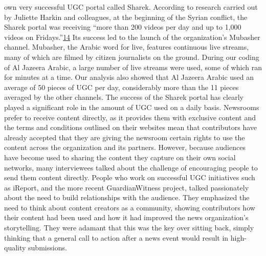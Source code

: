 \documentclass[symmetric, notoc, nobib]{towcenter-book}
\begin{document}
\begin{enumerate}
own very successful UGC portal called Sharek. According to research carried
out by Juliette Harkin and colleagues, at the beginning of the Syrian
conflict, the Sharek portal was receiving ``more than 200 videos per day and
up to 1,000 videos on Fridays.''{\href{#endnotes}{14}} Its success led to the launch of the organization's
Mubasher channel. Mubasher, the Arabic word for live, features
continuous live streams, many of which are filmed by citizen journalists on
the ground. During our coding of Al Jazeera Arabic, a large number of live
streams were used, some of which ran for minutes at a time. Our analysis
also showed that Al Jazeera Arabic used an average of 50 pieces of UGC per
day, considerably more than the 11 pieces averaged by the other channels.
The success of the Sharek portal has clearly played a significant role in the
amount of UGC used on a daily basis.
Newsrooms prefer to receive content directly, as it provides them with
exclusive content and the terms and conditions outlined on their websites
mean that contributors have already accepted that they are giving the newsroom
certain rights to use the content across the organization and its partners.
However, because audiences have become used to sharing the content
they capture on their own social networks, many interviewees talked about
the challenge of encouraging people to send them content directly. People
who work on successful UGC initiatives such as iReport, and the more
recent GuardianWitness project, talked passionately about the need to
build relationships with the audience. They emphasized the need to think
about content creators as a community, showing contributors how their
content had been used and how it had improved the news organization's
storytelling. They were adamant that this was the key over sitting back, simply
thinking that a general call to action after a news event would result in
high-quality submissions.


\end{enumerate}
\end{document}
